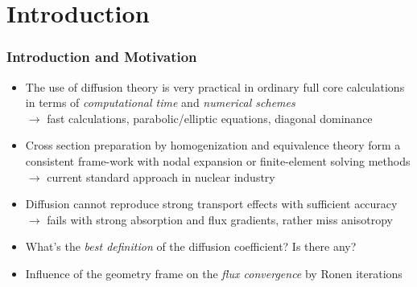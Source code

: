 \documentclass[black]{slideCEA}
\begin{document}
\section{Introduction}

\begin{frame}
  \frametitle{Introduction and Motivation}
  \begin{itemize} \large
    \setlength{\itemsep}{5mm}
    \item The use of \textcolor{ceared1}{diffusion theory} is very practical in ordinary \textcolor{ceared1}{full core calculations} in terms of \emph{computational time} and \emph{numerical schemes}\\
    {\hfill \normalsize \color{ceagreen3}
    $\rightarrow$ fast calculations, parabolic/elliptic equations, diagonal dominance
    }
    \item Cross section preparation by \textcolor{ceared1}{homogenization} and \textcolor{ceared1}{equivalence} theory form a consistent frame-work with \textcolor{ceablue1}{nodal expansion} or \textcolor{ceablue1}{finite-element} solving methods\\
    {\hfill \normalsize \color{ceagreen3}
    $\rightarrow$ current standard approach in nuclear industry
    }
    \item Diffusion \textcolor{ceared1}{cannot} reproduce strong transport effects with sufficient accuracy\\%


    {\hfill \normalsize \color{ceagreen3}
    $\rightarrow$ fails with strong absorption and flux gradients, rather miss anisotropy
    }
    \item {What's the \emph{best definition} of the diffusion coefficient? Is there any?}\\
    \item Influence of the {\color{ceared1}geometry frame} on the \emph{flux convergence} by Ronen iterations
  \end{itemize}
\end{frame}
\end{document}
